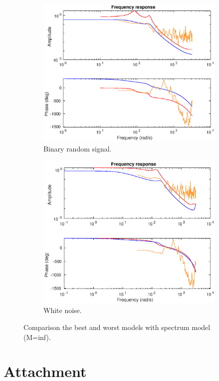 \documentclass[10pt,a4paper]{article}
\begin{document}
	\begin{figure}[ht]
		\footnotesize
		\centering
		\begin{subfigure}[t]{.45\linewidth}
		\centering\includegraphics[width=0.8\linewidth]{binaryCompareToInf.eps}
		\caption{Binary random signal.}
		\end{subfigure}
		\begin{subfigure}[t]{.45\linewidth}
		\centering\includegraphics[width=0.8\linewidth]{whiteNoiseCompareToInf.eps}
		\caption{White noise.}
		\end{subfigure}
  		\caption{Comparison the best and worst models with spectrum model (M=inf).}
  		\label{fig:spectrumModelCompare}
  	\end{figure}
\newpage
\section{Attachment}
	\label{matlabCode}
    
	
	
	
\end{document}
